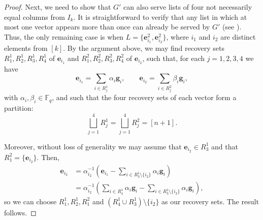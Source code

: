\documentclass[11pt,a4paper]{article}
\theoremstyle{definition}
\newcommand{\bfe}{{\boldsymbol e}}
\newcommand{\bfg}{{\boldsymbol g}}
\newcommand{\F}{\mathbb{F}}
\newcommand\jon[1]{{{\textcolor{orange}{Jonathan: #1}}}}
\begin{document}
\begin{proof}

Next, we need to show that $G'$ can also serve lists of four not necessarily equal columns from $I_k$. It is straightforward to verify that any list in which at most one vector appears more than once can already be served by $G'$ (see \cite[Lemma 3]{VARDY_YAAKOBI_2016}). Thus, the only remaining case is when $L = \{\bfe_{i_1}^2, \bfe_{i_2}^2\}$, where ${i_1}$ and ${i_2}$ are distinct elements from $[k]$. By the argument above, we may find recovery sets $R_1^1, R_2^1,R_3^1, R_4^1$ of $\bfe_{i_1}$ and $R_1^2, R_2^2,R_3^2, R_4^2$ of $\bfe_{i_2}$, such that, for each $j = 1,2,3,4$ we have
    \[
    \bfe_{i_1} = \sum_{i \in R_j^1} \alpha_i \bfg_i,
    \qquad
    \bfe_{i_2} = \sum_{i \in R_j^2} \beta_i \bfg_i,
\]
    with $\alpha_i, \beta_i \in \F_q$, and such that the four recovery sets of each vector form a partition: 
    $$
        \bigsqcup_{j=1}^4 R^1_{j} = \bigsqcup_{j=1}^4 R^2_{j} = [n+1].
    $$

    Moreover, without loss of generality we may assume that $\bfe_{i_2} \in R^1_{3}$ and that $R^2_{1} = \{\bfe_{i_2}\}$. Then, 
    \begin{align*}
        \bfe_{i_2} &= \alpha_{i_2}^{-1} \left( \bfe_{i_1} - \sum_{i \in R^1_{3}\setminus\{i_2\}} \alpha_i \bfg_i \right) \\
        &= \alpha_{i_2}^{-1} \left( \sum_{i \in R^1_{4}} \alpha_i\bfg_i - \sum_{i \in R^1_{3}\setminus\{i_2\}} \alpha_i \bfg_i \right),
    \end{align*}
    so we can choose $R^1_{1}, R^1_{2}, R^2_1$ and $(R^1_4 \cup R_3^1) \setminus\{i_2\}$ as our recovery sets. The result follows.
\end{proof}
\end{document}
